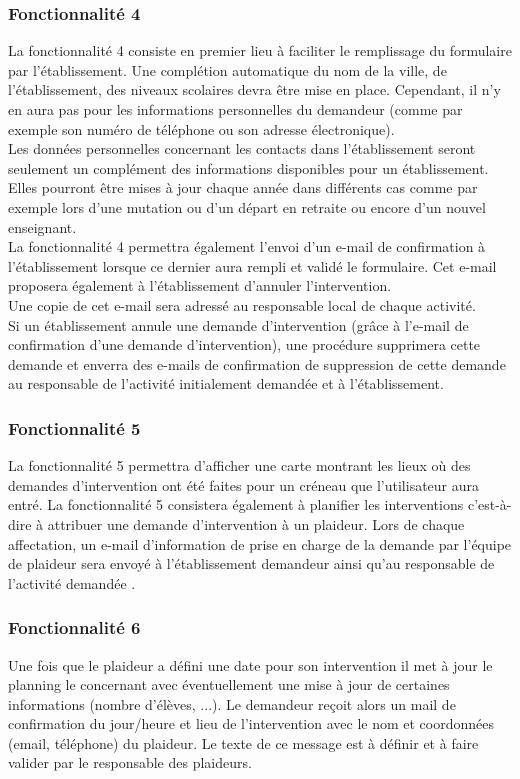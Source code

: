\subsubsection{Fonctionnalité 4}
La fonctionnalité 4 consiste en premier lieu à faciliter le remplissage du formulaire par l'établissement. 
Une complétion automatique du nom de la ville, de l'établissement, des niveaux scolaires devra être mise en place. Cependant, il n'y en aura pas pour les informations personnelles du demandeur (comme  par exemple son numéro de téléphone ou son adresse électronique).\\
Les données personnelles concernant les contacts dans l'établissement seront seulement un complément des informations disponibles pour un établissement. Elles pourront être mises à jour chaque année dans différents cas comme par exemple lors d'une mutation ou d'un départ en retraite ou encore d'un nouvel enseignant.   \\

La fonctionnalité 4 permettra également l'envoi d'un e-mail de confirmation à l'établissement lorsque ce dernier aura rempli et validé le formulaire. Cet e-mail proposera également à l'établissement d'annuler l'intervention. \\ Une copie de cet e-mail sera adressé au responsable local de chaque activité.\\

Si un établissement annule une demande d'intervention (grâce à l'e-mail de confirmation d'une demande d'intervention), une procédure supprimera cette demande et enverra des e-mails de confirmation de suppression de cette demande au responsable de l'activité initialement demandée et à l'établissement.  

\subsubsection{Fonctionnalité 5}
La fonctionnalité 5 permettra d'afficher une carte montrant les lieux où des demandes d'intervention ont été faites pour un créneau que l'utilisateur aura entré.
La fonctionnalité 5 consistera également à planifier les interventions c'est-à-dire à attribuer une demande d'intervention à un plaideur.  
Lors de chaque affectation, un e-mail d'information de prise en charge de la demande par l'équipe de plaideur sera envoyé à l'établissement demandeur ainsi qu'au responsable de l'activité demandée .
\\

\subsubsection{Fonctionnalité 6}
Une fois que le plaideur a défini une date pour son intervention il met à jour le
planning le concernant avec éventuellement une mise à jour de certaines informations (nombre d'élèves, ...). Le demandeur reçoit alors un mail de confirmation du jour/heure et lieu de l'intervention avec le nom et coordonnées (email, téléphone) du plaideur. Le texte de ce message est à définir et à faire valider par le responsable des plaideurs. \\

